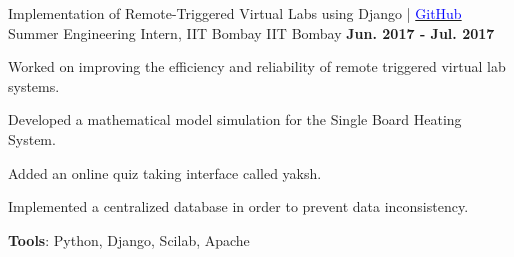 \begin{cventries}
    \cventry
    {Implementation of Remote-Triggered Virtual Labs using Django | \href{https://github.com/shan18/SBHS-Vlabs}{\textcolor{Blue}{GitHub}}}
    {Summer Engineering Intern, IIT Bombay}
    {IIT Bombay}
    {\textbf{Jun. 2017 - Jul. 2017}}
    {
      \begin{cvitems}
        \item{Worked on improving the efficiency and reliability of remote triggered virtual lab systems.}
        \item{Developed a mathematical model simulation for the Single Board Heating System.}
        \item{Added an online quiz taking interface called yaksh.}
        \item{Implemented a centralized database in order to prevent data inconsistency.}
        \item{\textbf{Tools}: Python, Django, Scilab, Apache}
      \end{cvitems}
    }
\end{cventries}